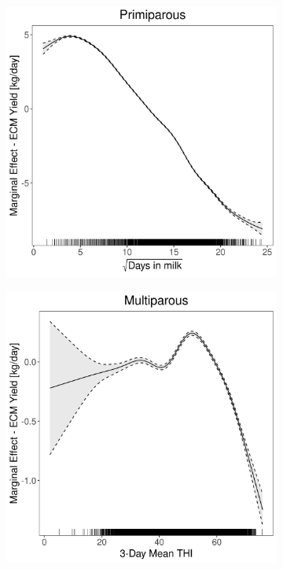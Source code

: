 \begin{figure}[H]
\begin{subfigure}[b]{0.45\textwidth}
    \end{subfigure}
    \hspace{0.05\textwidth} %
    \begin{subfigure}[b]{0.45\textwidth}
        \centering
        \includegraphics[width=\textwidth]{thesis/figures/models/ecm/before2010/ho_ecm_before2010/ho_ecm_before2010_marginal_dim_milk_primi.png}
    \end{subfigure}
    \begin{subfigure}[b]{0.45\textwidth}
        \centering
        \includegraphics[width=\textwidth]{thesis/figures/models/ecm/before2010/ho_ecm_before2010/ho_ecm_before2010_marginal_thi_milk_multi.png}

\end{subfigure}
\end{figure}

